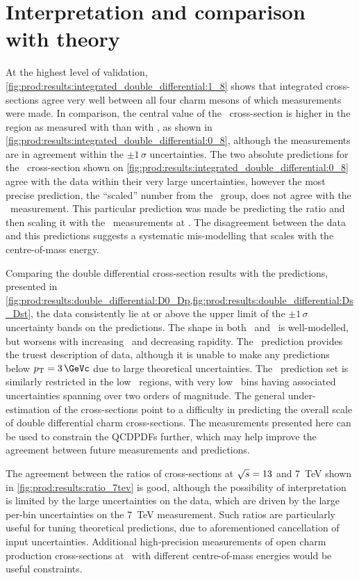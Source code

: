 \section{Interpretation and comparison with theory}
\label{chap:prod:results:discussion}

At the highest level of validation, 
\cref{fig:prod:results:integrated_double_differential:1_8} shows that 
integrated cross-sections agree very well between all four charm mesons of 
which measurements were made.
In comparison, the central value of the \ccbar\ cross-section is higher in the 
 region as measured with \PDzero than with \PDplus, as shown in 
\cref{fig:prod:results:integrated_double_differential:0_8}, although the 
measurements are in agreement within the $\pm1\,\sigma$ uncertainties.
The two absolute predictions for the \ccbar\ cross-section shown on 
\cref{fig:prod:results:integrated_double_differential:0_8} agree with the data 
within their very large uncertainties, however the most precise prediction, the 
``scaled'' number from the \nnpdfl\ group, does not agree with the \lhcb\ 
measurement.
This particular prediction was made be predicting the ratio  
and then scaling it with the \lhcb\ measurements at \sqrtseq{7}.
The disagreement between the data and this predictions suggests a systematic 
mis-modelling that scales with the centre-of-mass energy.

Comparing the double differential cross-section results with the predictions, 
presented in 
\cref{fig:prod:results:double_differential:D0_Dp,fig:prod:results:double_differential:Ds_Dst}, 
the data consistently lie at or above the upper limit of the $\pm1\,\sigma$ 
uncertainty bands on the predictions.
The shape in both \pT\ and \rapidity\ is well-modelled, but worsens with 
increasing \pT\ and decreasing rapidity.
The \gmvfns\ prediction provides the truest description of data, although it is 
unable to make any predictions below $\pT = \SI{3}{\GeVc}$ due to large 
theoretical uncertainties.
The \fonll\ prediction set is similarly restricted in the low \pT\ regions, 
with very low \pT\ bins having associated uncertainties spanning over two 
orders of magnitude.
The general under-estimation of the cross-sections point to a difficulty in 
predicting the overall scale of double differential charm cross-sections.
The measurements presented here can be used to constrain the \aclp{QCDPDF} 
further, which may help improve the agreement between future measurements and 
predictions.

The agreement between the ratios of cross-sections at $\sqrt{s} = 13$ and 
\SI{7}{\TeV} shown in \cref{fig:prod:results:ratio_7tev} is good, although the 
possibility of interpretation is limited by the large uncertainties on the 
data, which are driven by the large per-bin uncertainties on the \SI{7}{\TeV} 
measurement.
Such ratios are particularly useful for tuning theoretical predictions, due to 
aforementioned cancellation of input uncertainties.
Additional high-precision measurements of open charm production cross-sections 
at \lhcb\ with different centre-of-mass energies would be useful constraints.

